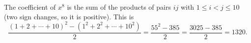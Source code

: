 The coefficient of $x^8$ is the sum of the products of pairs $ij$ with $1\le i<j\le10$ (two sign changes, so it is positive). This is
\[\dfrac{(1+2+\cdots+10)^2-(1^2+2^2+\cdots+10^2)}{2}=\dfrac{55^2-385}{2}=\dfrac{3025-385}{2}=\boxed{1320}.\]
